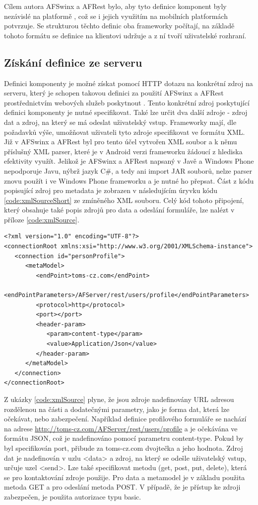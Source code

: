 Cílem autora AFSwinx a AFRest bylo, aby tyto definice komponent byly nezávislé na platformě \cite{on-web-services}, což se i jejich využitím na mobilních platformách potvrzuje. Se strukturou těchto definic oba frameworky počítají, na základě tohoto formátu se definice na klientovi udržuje a z ní tvoří uživatelské rozhraní. 

\subsection{Získání definice ze serveru}
Definici komponenty je možné získat pomocí HTTP dotazu na konkrétní zdroj na serveru, který je schopen takovou definici za použití AFSwinx a AFRest prostřednictvím webových služeb poskytnout \cite{on-web-services}. Tento konkrétní zdroj poskytující definici komponenty je nutné specifikovat. Také lze určit dva další zdroje - zdroj dat a zdroj, na který se má odeslat uživatelský vstup. Frameworky mají, dle požadavků výše, umožňovat uživateli tyto zdroje specifikovat ve formátu XML. Již v AFSwinx a AFRest byl pro tento účel vytvořen XML soubor a k němu příslušný XML parser, které je v Android verzi frameworku žádoucí z hlediska efektivity využít. Jelikož je AFSwinx a AFRest napsaný v Javě a Windows Phone nepodporuje Javu, nýbrž jazyk C\#, a tedy ani import JAR souborů, nelze parser znovu použít i ve Windows Phone frameworku a je nutné ho přepsat. Část z kódu popisující zdroj pro metadata je zobrazen v následujícím úryvku kódu \ref{code:xmlSourceShort} ze zmíněného XML souboru. Celý kód tohoto připojení, který obsahuje také popis zdrojů pro data a odeslání formuláře, lze nalézt v příloze \ref{code:xmlSource}. 

\begin{lstlisting}[caption=Ukázka XML specifikace zdroje pro metadata,
label={code:xmlSourceShort}, basicstyle=\footnotesize]
<?xml version="1.0" encoding="UTF-8"?>
<connectionRoot xmlns:xsi="http://www.w3.org/2001/XMLSchema-instance">
   <connection id="personProfile">
      <metaModel>
         <endPoint>toms-cz.com</endPoint>
         <endPointParameters>/AFServer/rest/users/profile</endPointParameters>
         <protocol>http</protocol>
         <port></port>
         <header-param>
            <param>content-type</param>
            <value>Application/Json</value>
         </header-param>
      </metaModel>
   </connection>
</connectionRoot>
\end{lstlisting}

Z ukázky \ref{code:xmlSource} plyne, že jsou zdroje nadefinovány URL adresou rozdělenou na části a dodatečnými parametry, jako je forma dat, která lze očekávat, nebo zabezpečení. Například definice profilového formuláře se nachází na adrese \url{http://toms-cz.com/AFServer/rest/users/profile} a je očekávána ve formátu JSON, což je nadefinováno pomocí parametru content-type. Pokud by byl specifikován port, přibude za toms-cz.com dvojtečka a jeho hodnota. Zdroj dat je nadefinován v uzlu <data> a zdroj, na který se odešle uživatelský vstup, určuje uzel <send>. Lze také specifikovat metodu (get, post, put, delete), která se pro kontaktování zdroje použije. Pro data a metamodel je v základu použita metoda GET a pro odeslání metoda POST. V případě, že je přístup ke zdroji zabezpečen, je použita autorizace typu basic.

